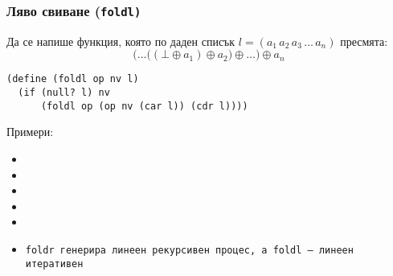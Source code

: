 \documentclass{beamer}
\begin{document}
\begin{frame}[fragile]
  \frametitle{Ляво свиване (\tt{foldl})}

  Да се напише функция, която по даден списък $l = (a_1\,a_2\,a_3\,\ldots\,a_n)$ пресмята:
  \begin{equation*}
    \Big(\ldots\big((\bot \oplus a_1) \oplus a_2\big) \oplus \ldots\Big) \oplus a_n
  \end{equation*}

  \pause

\begin{verbatim}
(define (foldl op nv l)
  (if (null? l) nv
      (foldl op (op nv (car l)) (cdr l))))
\end{verbatim}

  \pause

  Примери:
  \small
  \begin{itemize}[<+->]
  \item {}
  \item {}
  \item {}
  \item {}
  \item {}
  \item \tt{foldr} генерира линеен рекурсивен процес, а \tt{foldl} --- линеен итеративен
  \end{itemize}
\end{frame}
\end{document}
